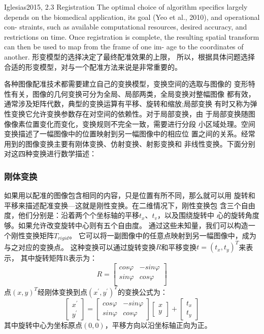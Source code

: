 Iglesias2015, 2.3 Registration
The optimal choice of algorithm specifics largely depends on the
biomedical application, its goal (Yeo et al., 2010), and operational con-
straints, such as available computational resources, desired accuracy,
and restrictions on time. Once registration is complete, the resulting
spatial transform can then be used to map from the frame of one im-
age to the coordinates of another.
形变模型的选择决定了最终配准效果的上限，
所以，根据具体问题选择合适的形变模型，对与一个配准方法来说是非常重要的。

各种图像配准技术都需要建立自己的变换模型，变换空间的选取与图像的
变形特性有关，图像的几何变换可分为全局、局部两类，全局变换对整幅图像
都有效，通常涉及矩阵代数，典型的变换运算有平移、旋转和缩放;局部变换
有时又称为弹性变换它允许变换参数存在对空间的依赖性。对于局部变换，由
于局部变换随图像像素位置变化而变化，变换规则不完全一致，需要进行分段
小区域处理。空间变换描述了一幅图像中的位置映射到另一幅图像中的相应位
置之间的关系。经常用到的图像变换主要有刚体变换、仿射变换、射影变换和
非线性变换。下面分别对这四种变换进行数学描述：

\subsubsection{刚体变换}
如果用以配准的图像包含相同的内容，只是位置有所不同，那么就可以用
旋转和平移来描述配准变换---这就是刚性变换。在二维情况下，刚性变换包
含三个自由度，他们分别是：沿着两个个坐标轴的平移$t_x$、$t_v$，以及围绕旋转中
心的旋转角度够。如果允许改变旋转中心则有五个自由度。
通过这些未知量，我们可以构造一个刚性变换矩阵$T_{rigid}$。
它可以将一副图像中的任意点映射到另一幅图像中，成为与之对应的变换点。
这种变换可以通过旋转变换$R$和平移变换$t=(t_x,t_y)^T$来表示，
其中旋转矩阵R表示为：
\begin{equation}
  R=\begin{bmatrix}
    cos\varphi & -sin\varphi\\
    sin\varphi & cos\varphi\\
  \end{bmatrix}
\end{equation}
点$(x,y)^T$经刚体变换到点$(x^\prime,y^\prime)^T$的变换公式为：
\begin{equation}
  \begin{bmatrix}
    x^\prime\\
    y^\prime
  \end{bmatrix}=
  \begin{bmatrix}
    cos\varphi& -sin\varphi\\
    sin\varphi& cos\varphi
  \end{bmatrix}
  \begin{bmatrix}
    x\\
    y
  \end{bmatrix}+
  \begin{bmatrix}
    t_x\\
    t_y
  \end{bmatrix}
\end{equation}
其中旋转中心为坐标原点$(0,0)$，平移方向以沿坐标轴正向为正。
